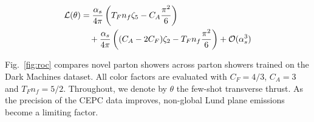 \begin{align}
  \mathcal{L}(\theta) &= \frac{\alpha_s}{4\pi} \left( T_F n_f \zeta_{5} - C_A \frac{\pi^2}{6} \right) \nonumber \\
  &\quad + \frac{\alpha_s}{4\pi} \left( (C_A - 2C_F) \zeta_{2} - T_F n_f \frac{\pi^2}{6} \right) + \mathcal{O}(\alpha_s^3) \label{eq:3}
\end{align}

Fig.~\ref{fig:roc} compares novel parton showers across parton showers
trained on the Dark Machines dataset. All color factors are evaluated
with $C_F = 4/3$, $C_A = 3$ and $T_F n_f = 5/2$. Throughout, we denote
by $\theta$ the few-shot transverse thrust. As the precision of the CEPC
data improves, non-global Lund plane emissions become a limiting factor.

